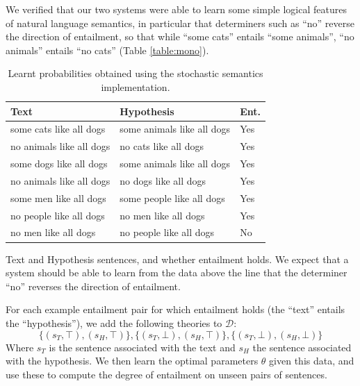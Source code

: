 \documentclass[11pt]{article}
\theoremstyle{definition}
\begin{document}
We verified that our two systems were able to learn some simple
logical features of natural language semantics, in particular that
determiners such as ``no'' reverse the direction of entailment, so
that while ``some cats'' entails ``some animals'', ``no animals''
entails ``no cats'' (Table \ref{table:mono}).


\begin{table}
  \parbox{.62\linewidth}{
    \begin{center}
      \begin{tabular}{|l|l|l|}
        \hline
        Text & Hypothesis & Ent.\\
        \hline
        some cats like all dogs & some animals like all dogs & Yes\\
        no animals like all dogs & no cats like all dogs & Yes\\
        some dogs like all dogs & some animals like all dogs & Yes\\
        no animals like all dogs & no dogs like all dogs & Yes\\
        some men like all dogs & some people like all dogs & Yes\\
        \hline
        no people like all dogs & no men like all dogs & Yes\\
        no men like all dogs & no people like all dogs & No\\
        \hline
      \end{tabular}
      \caption{Text and Hypothesis sentences, and whether entailment
        holds. We expect that a system should be able to learn from
        the data above the line that the determiner ``no'' reverses the
        direction of entailment.}
      \label{table:mono}
    \end{center}
  }
  \hfill
  \parbox{.32\linewidth}{
    \centering
    \caption{Learnt probabilities obtained using the
      stochastic semantics implementation.}
    \label{table:lexical-sato}
  }
\end{table}


For each example entailment pair for which entailment holds (the
``text'' entails the ``hypothesis''), we add
the following theories to $\mathcal{D}$:
\[
\{(s_T,\top),(s_H,\top)\}, \{(s_T,\bot),(s_H,\top)\},\{(s_T,\bot),(s_H,\bot)\}
\]
Where $s_T$ is the sentence associated with the text and $s_H$ the
sentence associated with the hypothesis. We then learn the optimal
parameters $\theta$ given this data, and use these to compute the
degree of entailment on unseen pairs of sentences.
\end{document}
